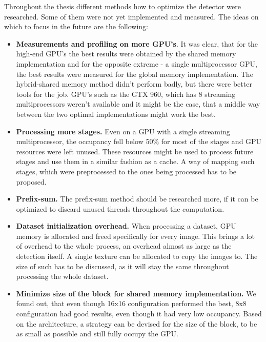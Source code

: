 Throughout the thesis different methods how to optimize the detector were researched. Some of them were not yet implemented and measured. The ideas on which to focus in the future are the following:

\begin{itemize}
	\item \textbf{Measurements and profiling on more GPU's}. It was clear, that for the high-end GPU's the best results were obtained by the shared memory implementation and for the opposite extreme - a single multiprocessor GPU, the best results were measured for the global memory implementation. The hybrid-shared memory method didn't perform badly, but there were better tools for the job. GPU's such as the GTX 960, which has 8 streaming multiprocessors weren't available and it might be the case, that a middle way between the two optimal implementations might work the best.
	\item \textbf{Processing more stages.} Even on a GPU with a single streaming multiprocessor, the occupancy fell below 50\% for most of the stages and GPU resources were left unused. These resources might be used to process future stages and use them in a similar fashion as a cache. A way of mapping such stages, which were preprocessed to the ones being processed has to be proposed.
	\item \textbf{Prefix-sum.} The prefix-sum method should be researched more, if it can be optimized to discard unused threads throughout the computation.
	\item \textbf{Dataset initialization overhead.} When processing a dataset, GPU memory is allocated and freed specifically for every image. This brings a lot of overhead to the whole process, an overhead almost as large as the detection itself. A single texture can be allocated to copy the images to. The size of such has to be discussed, as it will stay the same throughout processing the whole dataset.
	\item \textbf{Minimize size of the block for shared memory implementation.} We found out, that even though 16x16 configuration performed the best, 8x8 configuration had good results, even though it had very low occupancy. Based on the architecture, a strategy can be devised for the size of the block, to be as small as possible and still fully occupy the GPU.
\end{itemize}



\nocite{zemcik-high-performance}
\nocite{herout-realtime-cuda}
\nocite{warps-occupancy}
\nocite{memory-coalescing}
\nocite{gpu-opt-fundamentals}